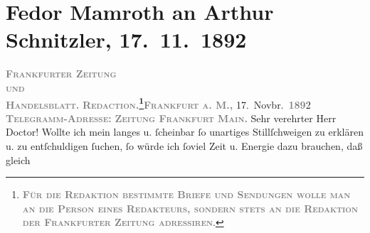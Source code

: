 

         
         \renewcommand{\erwaehntePersonen}{Personen: Rudolf Lothar, Eduard Sack}
         \renewcommand{\erwaehnteInstitutionen}{Institutionen: Frankfurter Städtisches Schauspielhaus, Frankfurter Zeitung}
         \renewcommand{\erwaehnteOrte}{Orte: Berlin, Frankfurt am Main, Wien}
         \renewcommand{\erwaehnteWerke}{Werke: Anatol, Cäsar Borgia’s Ende, Das Märchen. Schauspiel in drei Aufzügen, Sterben. Novelle}
               \section[Fedor Mamroth an Arthur Schnitzler, 17. 11. 1892]{ Fedor Mamroth an Arthur Schnitzler, 17. 11. 1892}\nopagebreak{}\rehead{ }\begin{ledgroupsized}[t]{13cm}\normalsize\beginnumbering \toendnotes[C]{\smallbreak\pagebreak[2]} 
\toendnotes[C]{\smallbreak}\pstart
           \noindent{}{\pb}\textcolor{gray}{\textbf{\textsc{Frankfurter Zeitung}}}{\\}\textsc{\textcolor{gray}{\textbf{und}}}{\\}\textcolor{gray}{\textbf{\textsc{Handelsblatt.}}}\pend
           \pstart
           \textcolor{gray}{\textbf{\textsc{Redaction.\footnote{\noindent{}\textcolor{gray}{\textbf{\textsc{Für die Redaktion bestimmte Briefe und
                                       Sendungen wolle man  an die
                                       Person eines Redakteurs, sondern stets \textbf{an die
                                          Redaktion der Frankfurter Zeitung} adressiren}}}.}}}}\hfill \textcolor{gray}{\textbf{\textsc{Frankfurt a. M.,}}}{ }17. Novbr. \textsc{\textcolor{gray}{\textbf{189}}}2\pend
           \pstart
           \textcolor{gray}{\textbf{\textsc{Telegramm-Adresse:}}}\pend
           \pstart
           \textcolor{gray}{\textbf{\textsc{Zeitung Frankfurt Main.}}}\pend
           \pstart{}Sehr verehrter Herr Doctor!\pend\pstart
           Wollte ich mein langes u. ſcheinbar ſo unartiges Stillſchweigen zu erklären u. zu
               entſchuldigen ſuchen, ſo würde ich ſoviel Zeit u. Energie dazu brauchen, daß gleich

\end{ledgroupsized}
